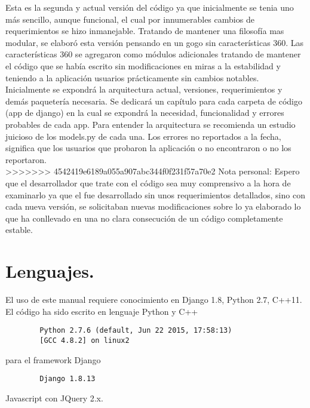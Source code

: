 \documentclass[10pt,a4paper]{book}
\begin{document}
	Esta es la segunda y actual versión del código ya que inicialmente se tenia uno más sencillo, aunque funcional, el cual por innumerables cambios de requerimientos se hizo inmanejable. Tratando de mantener una filosofía mas modular, se elaboró esta versión pensando en un gogo sin características 360. Las características 360 se agregaron como módulos adicionales tratando de mantener el código que se había escrito sin modificaciones en miras a la estabilidad y teniendo a la aplicación usuarios prácticamente sin cambios notables.\\
	
	Inicialmente se expondrá la arquitectura actual, versiones, requerimientos y demás paquetería necesaria. Se dedicará un capítulo para cada carpeta de código (app de django) en la cual se expondrá la necesidad, funcionalidad y errores probables de cada app. Para entender la arquitectura se recomienda un estudio juicioso de los models.py de cada una. Los errores no reportados a la fecha, significa que los usuarios que probaron la aplicación o no encontraron o no los reportaron.\\
	
>>>>>>> 4542419e6189a055a907abc344f0f231f57a70e2
	Nota personal: Espero que el desarrollador que trate con el código sea muy comprensivo a la hora de examinarlo ya que el fue desarrollado sin unos requerimientos detallados, sino con cada nueva versión, se solicitaban nuevas modificaciones sobre lo ya elaborado lo que ha conllevado en una no clara consecución de un código completamente estable.\\


	\section{Lenguajes.}
	El uso de este manual requiere conocimiento en Django 1.8, Python 2.7, C++11.
	El código ha sido escrito en lenguaje Python y C++
	\begin{verbatim}
		Python 2.7.6 (default, Jun 22 2015, 17:58:13)
		[GCC 4.8.2] on linux2
	\end{verbatim}
	para el framework Django
	\begin{verbatim}
		Django 1.8.13
	\end{verbatim}
	Javascript con JQuery 2.x.
\end{document}
